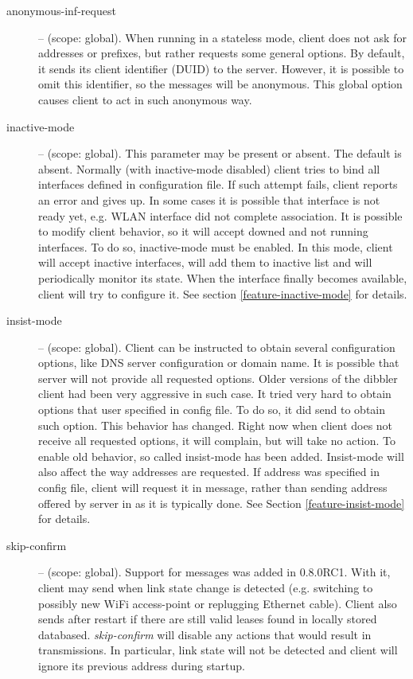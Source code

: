 \begin{description}
\item[anonymous-inf-request] -- (scope: global). When running in a
  stateless mode, client does not ask for addresses or prefixes, but
  rather requests some general options. By default, it sends its
  client identifier (DUID) to the server. However, it is possible to
  omit this identifier, so the  messages will be
  anonymous. This global option causes client to act in such anonymous
  way.

 \item[inactive-mode] -- (scope: global). This parameter may be
   present or absent. The default is absent. Normally (with
   inactive-mode disabled) client tries to bind all interfaces defined
   in configuration file. If such attempt fails, client reports an
   error and gives up. In some cases it is possible that interface is
   not ready yet, e.g. WLAN interface did not complete association. It
   is possible to modify client behavior, so it will accept downed and
   not running interfaces. To do so, inactive-mode must be enabled. In
   this mode, client will accept inactive interfaces, will add them to
   inactive list and will periodically monitor its state. When the
   interface finally becomes available, client will try to configure
   it. See section \ref{feature-inactive-mode} for details.

 \item[insist-mode] -- (scope: global). Client can be instructed to
   obtain several configuration options, like DNS server configuration
   or domain name. It is possible that server will not provide all
   requested options. Older versions of the dibbler client had been
   very aggressive in such case. It tried very hard to obtain options
   that user specified in config file. To do so, it did
   send  to obtain such option. This behavior has
   changed. Right now when client does not receive all requested
   options, it will complain, but will take no action. To enable old
   behavior, so called insist-mode has been added. Insist-mode will
   also affect the way addresses are requested. If address was
   specified in config file, client will request it in 
   message, rather than sending address offered by server
   in  as it is typically done. See
   Section \ref{feature-insist-mode} for details.

 \item[skip-confirm] -- (scope: global). Support for  messages
   was added in 0.8.0RC1. With it, client may send  when link
   state change is detected (e.g. switching to possibly new WiFi
   access-point or replugging Ethernet cable). Client also sends
    after restart if there are still valid leases found
   in locally stored databased. \emph{skip-confirm} will disable any
   actions that would result in  transmissions. In
   particular, link state will not be detected and client will ignore
   its previous address during startup.


\end{description}
